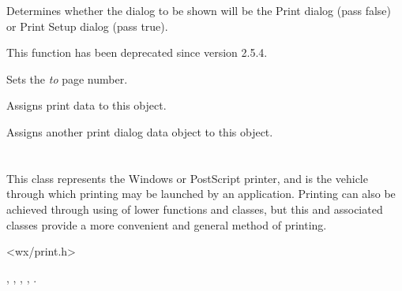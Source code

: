 \label{wxprintdialogdatasetsetupdialog}


Determines whether the dialog to be shown will be the Print dialog
(pass false) or Print Setup dialog (pass true).

This function has been deprecated since version 2.5.4.

\label{wxprintdialogdatasettopage}


Sets the {\it to} page number.


\label{wxprintdialogdataassign}


Assigns print data to this object.


Assigns another print dialog data object to this object.

\section{}\label{wxprinter}

This class represents the Windows or PostScript printer, and is the vehicle through
which printing may be launched by an application. Printing can also
be achieved through using of lower functions and classes, but
this and associated classes provide a more convenient and general
method of printing.




<wx/print.h>


, 
, 
, 
, 
.



\label{wxprinterctor}

